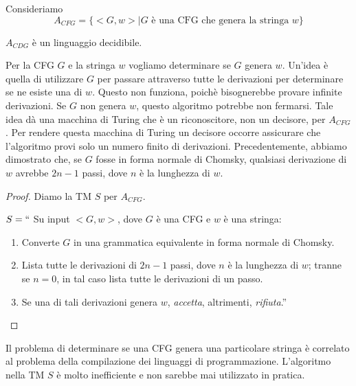 \documentclass[12pt]{report}
\newcounter{theorem}
\begin{document}
Consideriamo
\[
A_{CFG} = \{<G, w> \mid G \text{ è una CFG che genera la stringa }w\}
\]
\begin{theorem}{}{}
$A_{CDG}$ è un linguaggio decidibile.
\end{theorem}
Per la CFG $G$ e la stringa $w$ vogliamo determinare se $G$ genera $w$. Un'idea è quella di utilizzare $G$ per passare attraverso tutte le derivazioni per determinare se ne esiste una di $w$. Questo non funziona, poichè bisognerebbe provare infinite derivazioni. Se $G$ non genera $w$, questo algoritmo potrebbe non fermarsi. Tale idea dà una macchina di Turing che è un riconoscitore, non un decisore, per $A_{CFG}$. Per rendere questa macchina di Turing un decisore occorre assicurare che l'algoritmo provi solo un numero finito di derivazioni. Precedentemente, abbiamo dimostrato che, se $G$ fosse in forma normale di Chomsky, qualsiasi derivazione di $w$ avrebbe $2n - 1$ passi, dove $n$ è la lunghezza di $w$.
\begin{proof}
	Diamo la TM $S$ per $A_{CFG}$.

	$S = ``$ Su input $<G, w>$, dove $G$ è una CFG e $w$ è una stringa:
	\begin{enumerate}
		\item Converte $G$ in una grammatica equivalente in forma normale di Chomsky.
		\item Lista tutte le derivazioni di $2n - 1$ passi, dove $n$ è la lunghezza di $w$; tranne se $n = 0$, in tal caso lista tutte le derivazioni di un passo.
		\item Se una di tali derivazioni genera $w$, \textit{accetta}, altrimenti, \textit{rifiuta}.''
	\end{enumerate}
\end{proof}
Il problema di determinare se una CFG genera una particolare stringa è correlato al problema della compilazione dei linguaggi di programmazione. L'algoritmo nella TM $S$ è molto inefficiente e non sarebbe mai utilizzato in pratica.
\end{document}
